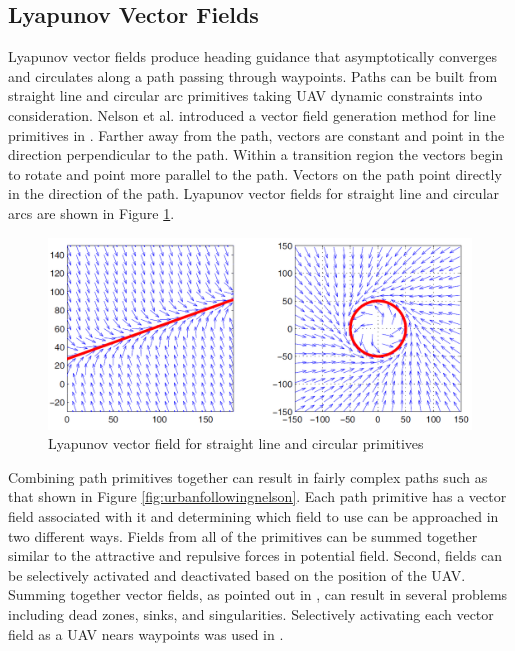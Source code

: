 \documentclass[numbered,pdftex]{ohio-etd}
\begin{document}
\subsection{Lyapunov Vector Fields}
Lyapunov vector fields produce heading guidance that asymptotically converges and circulates along a path passing through waypoints. Paths can be built from straight line and circular arc primitives taking UAV dynamic constraints into consideration. Nelson et al. introduced a vector field generation method for line primitives in \cite{nelson_cooperative_2005}. Farther away from the path, vectors are constant and point in the direction perpendicular to the path. Within a transition region the vectors begin to rotate and point more parallel to the path. Vectors on the path point directly in the direction of the path. Lyapunov vector fields for straight line and circular arcs are shown in Figure \ref{fig:nelsonlyapunov}.
\begin{figure}
	\centering
	\includegraphics[width=13cm]{PaperFigures/nelsonLyapunov}
	\caption{Lyapunov vector field for straight line and circular primitives}
	\label{fig:nelsonlyapunov}
\end{figure}

Combining path primitives together can result in fairly complex paths such as that shown in Figure \ref{fig:urbanfollowingnelson}. Each path primitive has a vector field associated with it and determining which field to use can be approached in two different ways. Fields from all of the primitives can be summed together similar to the attractive and repulsive forces in potential field. Second, fields can be selectively activated and deactivated based on the position of the UAV. Summing together vector fields, as pointed out in \cite{nelson_cooperative_2005}, can result in several problems including dead zones, sinks, and singularities. Selectively activating each vector field as a UAV nears waypoints was used in \cite{nelson_cooperative_2005} \cite{nelson_vector_2006} \cite{nelson_vector_2007}.
\end{document}
